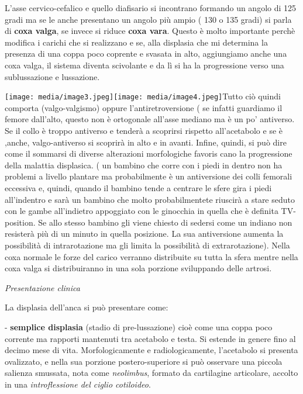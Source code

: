 \documentclass[]{article}
\begin{document}
L'asse cervico-cefalico e quello diafisario si incontrano formando un
angolo di 125 gradi ma se le anche presentano un angolo più ampio ( 130
o 135 gradi) si parla di \textbf{coxa valga}, se invece si riduce
\textbf{coxa vara}. Questo è molto importante perchè modifica i carichi
che si realizzano e se, alla displasia che mi determina la presenza di
una coppa poco coprente e svasata in alto, aggiungiamo anche una coxa
valga, il sistema diventa scivolante e da lì si ha la progressione verso
una sublussazione e lussazione.

\texttt{[image: media/image3.jpeg]}\texttt{[image: media/image4.jpeg]}Tutto
ciò quindi comporta (valgo-valgismo) oppure l'antiretroversione ( se
infatti guardiamo il femore dall'alto, questo non è ortogonale all'asse
mediano ma è un po' antiverso. Se il collo è troppo antiverso e tenderà
a scoprirsi rispetto all'acetabolo e se è ,anche, valgo-antiverso si
scoprirà in alto e in avanti. Infine, quindi, si può dire come il
sommarsi di diverse alterazioni morfologiche favoris cano la
progressione della malattia displasica. ( un bambino che corre con i
piedi in dentro non ha problemi a livello plantare ma probabilmente è un
antiversione dei colli femorali eccessiva e, quindi, quando il bambino
tende a centrare le sfere gira i piedi all'indentro e sarà un bambino
che molto probabilmentete riuscirà a stare seduto con le gambe
all'indietro appoggiato con le ginocchia in quella che è definita
TV-position. Se allo stesso bambino gli viene chiesto di sedersi come un
indiano non resisterà più di un minuto in quella posizione. La sua
antiversione aumenta la possibilità di intrarotazione ma gli limita la
possibilità di extrarotazione). Nella coxa normale le forze del carico
verranno distribuite su tutta la sfera mentre nella coxa valga si
distribuiranno in una sola porzione sviluppando delle artrosi.

\emph{Presentazione clinica}

La displasia dell'anca si può presentare come:

- \textbf{semplice displasia} (stadio di pre-lussazione) cioè come una
coppa poco corrente ma rapporti mantenuti tra acetabolo e testa. Si
estende in genere fino al decimo mese di vita. Morfologicamente e
radiologicamente, l'acetabolo si presenta ovalizzato, e nella sua
porzione postero-superiore si può osservare una piccola salienza
smussata, nota come \emph{neolimbus}, formato da cartilagine articolare,
accolto in una \emph{introflessione del ciglio cotiloideo}.
\end{document}
